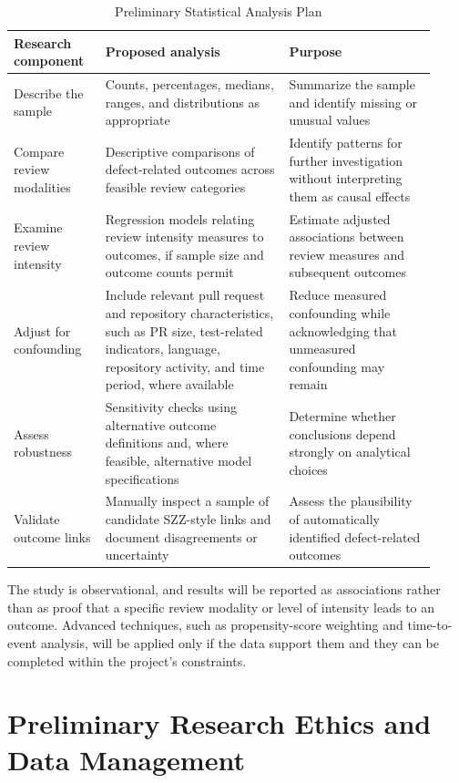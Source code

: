 \documentclass[stu,12pt,donotrepeattitle]{apa7}
\begin{document}
\begin{table}[ht]
\caption{Preliminary Statistical Analysis Plan}
\label{tab:analysis}
\small
\begin{tabular}{@{}>{\raggedright\arraybackslash}p{0.2\linewidth}>{\raggedright\arraybackslash}p{0.4\linewidth}>{\raggedright\arraybackslash}p{0.32\linewidth}@{}}
\toprule
Research component & Proposed analysis & Purpose \\
\midrule
Describe the sample & Counts, percentages, medians, ranges, and distributions as appropriate & Summarize the sample and identify missing or unusual values \\
Compare review modalities & Descriptive comparisons of defect-related outcomes across feasible review categories & Identify patterns for further investigation without interpreting them as causal effects \\
Examine review intensity & Regression models relating review intensity measures to outcomes, if sample size and outcome counts permit & Estimate adjusted associations between review measures and subsequent outcomes \\
Adjust for confounding & Include relevant pull request and repository characteristics, such as PR size, test-related indicators, language, repository activity, and time period, where available & Reduce measured confounding while acknowledging that unmeasured confounding may remain \\
Assess robustness & Sensitivity checks using alternative outcome definitions and, where feasible, alternative model specifications & Determine whether conclusions depend strongly on analytical choices \\
Validate outcome links & Manually inspect a sample of candidate SZZ-style links and document disagreements or uncertainty & Assess the plausibility of automatically identified defect-related outcomes \\
\bottomrule
\end{tabular}
\end{table}

The study is observational, and results will be reported as associations rather than as proof that a specific review modality or level of intensity leads to an outcome. Advanced techniques, such as propensity-score weighting and time-to-event analysis, will be applied only if the data support them and they can be completed within the project's constraints.

\section{Preliminary Research Ethics and Data Management}
\end{document}

